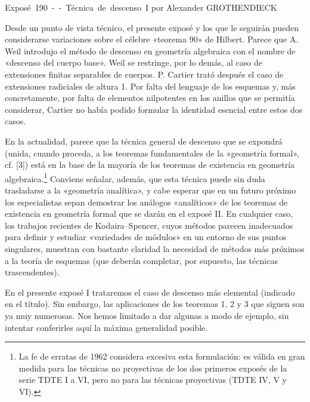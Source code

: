 \unit{Exposé 190 -- Técnica de descenso I}
%
  {por Alexander GROTHENDIECK}

Desde un punto de vista técnico, el presente exposé y los que le seguirán
pueden considerarse variaciones sobre el célebre «teorema 90» de Hilbert.
Parece que A. Weil introdujo el método de descenso en geometría algebraica con
el nombre de «descenso del cuerpo base». Weil se restringe, por lo demás, al
caso de extensiones finitas separables de cuerpos. P. Cartier trató después el
caso de extensiones radiciales de altura 1. Por falta del lenguaje de los
esquemas y, más concretamente, por falta de elementos nilpotentes en los
anillos que se permitía considerar, Cartier no había podido formular la
identidad esencial entre estos dos casos.

En la actualidad, parece que la técnica general de descenso que se expondrá
(unida, cuando proceda, a los teoremas fundamentales de la «geometría formal»,
cf. [3]) está en la base de la mayoría de los teoremas de existencia en
geometría algebraica.\footnote{La fe de erratas de 1962 considera excesiva esta
formulación: es válida en gran medida para las técnicas no proyectivas de los
dos primeros exposés de la serie TDTE I a VI, pero no para las técnicas
proyectivas (TDTE IV, V y VI).} Conviene señalar, además, que esta técnica puede
sin duda trasladarse a la «geometría analítica», y cabe esperar que en un
futuro próximo los especialistas sepan demostrar los análogos «analíticos» de
los teoremas de existencia en geometría formal que se darán en el exposé II.
En cualquier caso, los trabajos recientes de Kodaira--Spencer, cuyos métodos
parecen inadecuados para definir y estudiar «variedades de módulos» en un
entorno de sus puntos singulares, muestran con bastante claridad la necesidad
de métodos más próximos a la teoría de esquemas (que deberán completar, por
supuesto, las técnicas trascendentes).

En el presente exposé I trataremos el caso de descenso más elemental (indicado
en el título). Sin embargo, las aplicaciones de los teoremas 1, 2 y 3 que
siguen son ya muy numerosas. Nos hemos limitado a dar algunas a modo de
ejemplo, sin intentar conferirles aquí la máxima generalidad posible.

